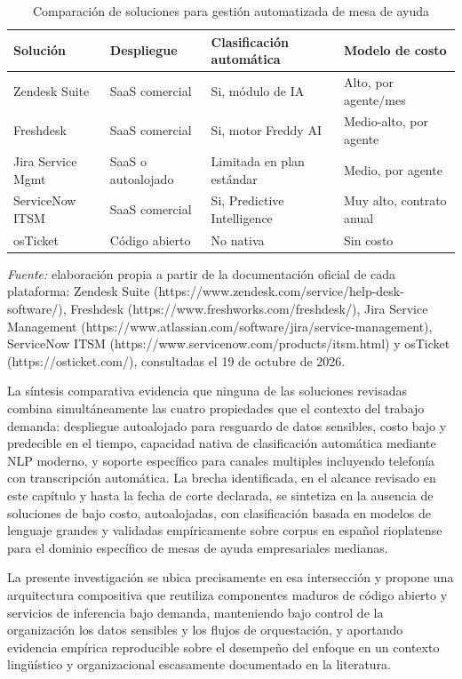 \begin{table}[htbp]
\centering
\caption{Comparación de soluciones para gestión automatizada de mesa de ayuda}
\label{tab:comparativa}
\small
\begin{tabular}{@{}>{\raggedright\arraybackslash}p{2.6cm} >{\raggedright\arraybackslash}p{2.8cm} >{\raggedright\arraybackslash}p{3.5cm} >{\raggedright\arraybackslash}p{3.8cm}@{}}
\toprule
\textbf{Solución} & \textbf{Despliegue} & \textbf{Clasificación automática} & \textbf{Modelo de costo} \\
\midrule
Zendesk Suite     & SaaS comercial      & Si, módulo de IA                & Alto, por agente/mes \\
Freshdesk         & SaaS comercial      & Si, motor Freddy AI             & Medio-alto, por agente \\
Jira Service Mgmt & SaaS o autoalojado  & Limitada en plan estándar       & Medio, por agente \\
ServiceNow ITSM   & SaaS comercial      & Si, Predictive Intelligence     & Muy alto, contrato anual \\
osTicket          & Código abierto      & No nativa                       & Sin costo \\
\bottomrule
\end{tabular}
\par\smallskip
{\footnotesize\textit{Fuente:} elaboración propia a partir de la documentación oficial de cada plataforma: Zendesk Suite (https://www.zendesk.com/service/help-desk-software/), Freshdesk (https://www.freshworks.com/freshdesk/), Jira Service Management (https://www.atlassian.com/software/jira/service-management), ServiceNow ITSM (https://www.servicenow.com/products/itsm.html) y osTicket (https://osticket.com/), consultadas el 19 de octubre de 2026.\par}
\end{table}

La síntesis comparativa evidencia que ninguna de las soluciones revisadas combina simultáneamente las cuatro propiedades que el contexto del trabajo demanda: despliegue autoalojado para resguardo de datos sensibles, costo bajo y predecible en el tiempo, capacidad nativa de clasificación automática mediante NLP moderno, y soporte específico para canales multiples incluyendo telefonía con transcripción automática. La brecha identificada, en el alcance revisado en este capítulo y hasta la fecha de corte declarada, se sintetiza en la ausencia de soluciones de bajo costo, autoalojadas, con clasificación basada en modelos de lenguaje grandes y validadas empíricamente sobre corpus en español rioplatense para el dominio específico de mesas de ayuda empresariales medianas.

La presente investigación se ubica precisamente en esa intersección y propone una arquitectura compositiva que reutiliza componentes maduros de código abierto y servicios de inferencia bajo demanda, manteniendo bajo control de la organización los datos sensibles y los flujos de orquestación, y aportando evidencia empírica reproducible sobre el desempeño del enfoque en un contexto lingüístico y organizacional escasamente documentado en la literatura.

\newpage
